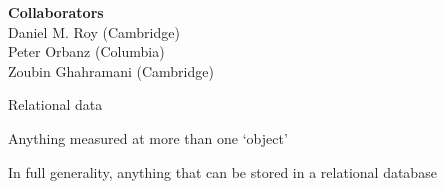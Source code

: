 \small
\renewcommand{\inserttotalframenumber}{11}

%

\begin{frame}
  \begin{block}{}
    \titlepage
  \end{block}
  \begin{center}
    {\bf  Collaborators}\\
    Daniel M. Roy (Cambridge)\\
    Peter Orbanz (Columbia)\\
    Zoubin Ghahramani (Cambridge)
  \end{center}
\end{frame}

\begin{frame}{Relational data}
  \begin{block}{}
    Anything measured at more than one `object'
  \end{block}
  \begin{block}{}
  	\center
	\vspace{-1\baselineskip}
    
  \end{block}
  \begin{block}{}
    In full generality, anything that can be stored in a relational database
  \end{block}
\end{frame}

